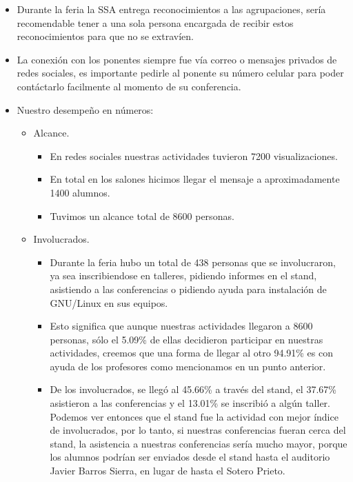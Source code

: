 \documentclass[a4paper,11pt]{article}                 %
\begin{document}
\begin{itemize}
    \item Durante la feria la SSA entrega reconocimientos a las agrupaciones, sería recomendable tener a una sola persona encargada de recibir estos reconocimientos para que no se extravíen.
    
    \item La conexión con los ponentes siempre fue vía correo o mensajes privados de redes sociales, es importante pedirle al ponente su número celular para poder contáctarlo facilmente al momento de su conferencia.
    
    \item Nuestro desempeño en números:
    
    \begin{itemize}
    \item Alcance.
    \begin{itemize}
     \item En redes sociales nuestras actividades tuvieron 7200 visualizaciones.
      \item En total en los salones hicimos llegar el mensaje a aproximadamente 1400 alumnos.
      \hrulefill
      \item Tuvimos un alcance total de 8600 personas.
    \end{itemize}
    \item Involucrados.
    \begin{itemize}
      \item Durante la feria hubo un total de 438 personas que se involucraron, ya sea inscribiendose en talleres, pidiendo informes en el stand, asistiendo a las conferencias o pidiendo ayuda para instalación de GNU/Linux en sus equipos.
      \item Esto significa que aunque nuestras actividades llegaron a 8600 personas, sólo el 5.09\% de ellas decidieron participar en nuestras actividades, creemos que una forma de llegar al otro 94.91\% es con ayuda de los profesores como mencionamos en un punto anterior.
      \item De los involucrados, se llegó al 45.66\% a través del stand, el 37.67\% asistieron a las conferencias y el 13.01\% se inscribió a algún taller. Podemos ver entonces que el stand fue la actividad con mejor índice de involucrados, por lo tanto, si nuestras conferencias fueran cerca del stand, la asistencia a nuestras conferencias sería mucho mayor, porque los alumnos podrían ser enviados desde el stand hasta el auditorio Javier Barros Sierra, en lugar de hasta el Sotero Prieto.
    \end{itemize}

\end{itemize}
\end{itemize}
\end{document}

